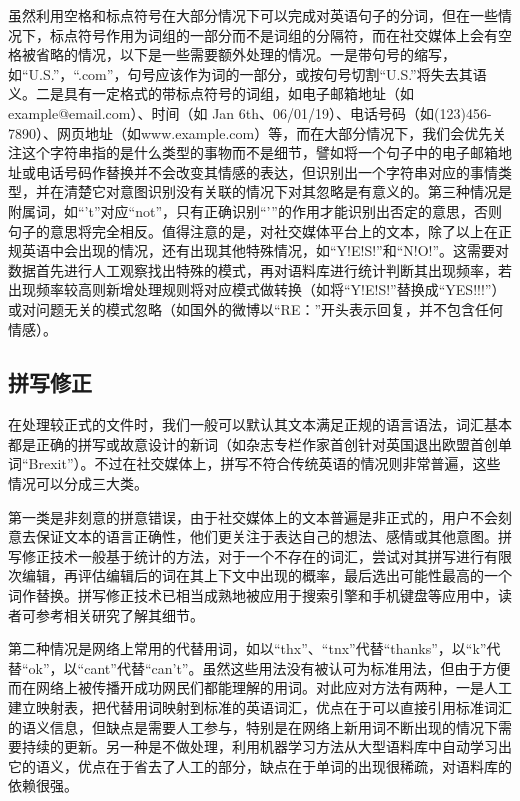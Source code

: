 虽然利用空格和标点符号在大部分情况下可以完成对英语句子的分词，但在一些情况下，标点符号作用为词组的一部分而不是词组的分隔符，而在社交媒体上会有空格被省略的情况，以下是一些需要额外处理的情况\cite{jackson2007natural}\cite{mitkov2004oxford}。一是带句号的缩写，如“U.S.”，“.com”，句号应该作为词的一部分，或按句号切割“U.S.”将失去其语义。二是具有一定格式的带标点符号的词组，如电子邮箱地址（如example@email.com）、时间（如 Jan 6th、06/01/19）、电话号码（如(123)456-7890）、网页地址（如www.example.com）等，而在大部分情况下，我们会优先关注这个字符串指的是什么类型的事物而不是细节，譬如将一个句子中的电子邮箱地址或电话号码作替换并不会改变其情感的表达，但识别出一个字符串对应的事情类型，并在清楚它对意图识别没有关联的情况下对其忽略是有意义的。第三种情况是附属词，如“'t”对应“not”，只有正确识别“'”的作用才能识别出否定的意思，否则句子的意思将完全相反。值得注意的是，对社交媒体平台上的文本，除了以上在正规英语中会出现的情况，还有出现其他特殊情况，如“Y!E!S!”和“N!O!”。这需要对数据首先进行人工观察找出特殊的模式，再对语料库进行统计判断其出现频率，若出现频率较高则新增处理规则将对应模式做转换（如将“Y!E!S!”替换成“YES!!!”）或对问题无关的模式忽略（如国外的微博以“RE：”开头表示回复，并不包含任何情感）。

\subsection{拼写修正}

在处理较正式的文件时，我们一般可以默认其文本满足正规的语言语法，词汇基本都是正确的拼写或故意设计的新词（如杂志专栏作家首创针对英国退出欧盟首创单词“Brexit”）。不过在社交媒体上，拼写不符合传统英语的情况则非常普遍，这些情况可以分成三大类。

第一类是非刻意的拼意错误，由于社交媒体上的文本普遍是非正式的，用户不会刻意去保证文本的语言正确性，他们更关注于表达自己的想法、感情或其他意图。拼写修正技术一般基于统计的方法，对于一个不存在的词汇，尝试对其拼写进行有限次编辑，再评估编辑后的词在其上下文中出现的概率，最后选出可能性最高的一个词作替换。拼写修正技术已相当成熟地被应用于搜索引擎和手机键盘等应用中，读者可参考相关研究\cite{ahmed2009revised}\cite{nejja2015context}了解其细节。

第二种情况是网络上常用的代替用词，如以“thx”、“tnx”代替“thanks”，以“k”代替“ok”，以“cant”代替“can't”。虽然这些用法没有被认可为标准用法，但由于方便而在网络上被传播开成功网民们都能理解的用词。对此应对方法有两种，一是人工建立映射表，把代替用词映射到标准的英语词汇，优点在于可以直接引用标准词汇的语义信息，但缺点是需要人工参与，特别是在网络上新用词不断出现的情况下需要持续的更新。另一种是不做处理，利用机器学习方法从大型语料库中自动学习出它的语义，优点在于省去了人工的部分，缺点在于单词的出现很稀疏，对语料库的依赖很强。

